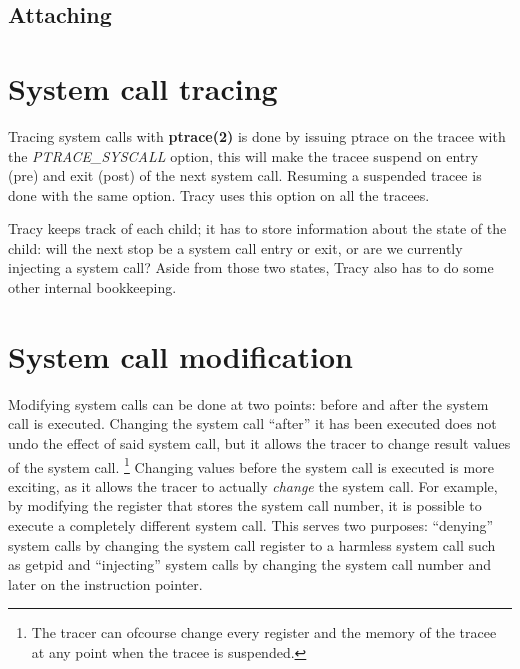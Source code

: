\documentclass[a4paper, 10pt]{report}
\begin{document}
\subsection{Attaching}

%

\section{System call tracing}

Tracing system calls with \textbf{ptrace(2)} is done by issuing ptrace on the
tracee with the \textit{PTRACE\_SYSCALL} option, this will make the tracee
suspend on entry (pre) and exit (post) of the next system call. Resuming a
suspended tracee is done with the same option. Tracy uses this option on
all the tracees.

Tracy keeps track of each child; it has to store information about the state
of the child: will the next stop be a system call entry or exit, or are we
currently injecting a system call? Aside from those two states, Tracy also
has to do some other internal bookkeeping.


\section{System call modification}

Modifying system calls can be done at two points: before and after the
system call is executed. Changing the system call ``after'' it has been executed
does not undo the effect of said system call, but it allows the tracer to change
result values of the system call.
\footnote{The tracer can ofcourse change every register and the memory of the
tracee at any point when the tracee is suspended.}
Changing values before the system call is executed is more exciting, as it
allows the tracer to actually \textit{change} the system call. For example, by
modifying the register that stores the system call number, it is possible to
execute a completely different system call. This serves two purposes:
``denying'' system calls by changing the system call register to a harmless
system call such as getpid and ``injecting'' system calls by changing the
system call number and later on the instruction pointer.
\end{document}
